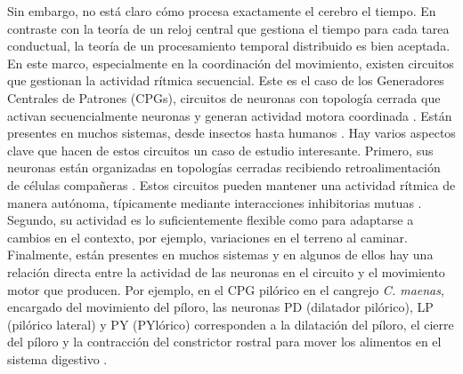 Sin embargo, no está claro cómo procesa exactamente el cerebro el tiempo. En contraste con la teoría de un reloj central que gestiona el tiempo para cada tarea conductual, la teoría de un procesamiento temporal distribuido \parencite{buonomano_temporal_1995,ivry_representation_1996} es bien aceptada. En este marco, especialmente en la coordinación del movimiento, existen circuitos que gestionan la actividad rítmica secuencial. Este es el caso de los Generadores Centrales de Patrones (CPGs), circuitos de neuronas con topología cerrada que activan secuencialmente neuronas y generan actividad motora coordinada \parencite{selverston_reliable_2000}. Están presentes en muchos sistemas, desde insectos hasta humanos \parencite{pearson_central_1972,marder_central_2001,mackay-lyons_central_2002,minassian_human_2017}. Hay varios aspectos clave que hacen de estos circuitos un caso de estudio interesante. Primero, sus neuronas están organizadas en topologías cerradas recibiendo retroalimentación de células compañeras \parencite{huerta_topology_2001}. Estos circuitos pueden mantener una actividad rítmica de manera autónoma, típicamente mediante interacciones inhibitorias mutuas \parencite{katz_evolution_2016}. Segundo, su actividad es lo suficientemente flexible como para adaptarse a cambios en el contexto, por ejemplo, variaciones en el terreno al caminar. Finalmente, están presentes en muchos sistemas y en algunos de ellos hay una relación directa entre la actividad de las neuronas en el circuito y el movimiento motor que producen. Por ejemplo, en el CPG pilórico en el cangrejo \textit{C. maenas}, encargado del movimiento del píloro, las neuronas PD (dilatador pilórico), LP (pilórico lateral) y PY (PYlórico) corresponden a la dilatación del píloro, el cierre del píloro y la contracción del constrictor rostral para mover los alimentos en el sistema digestivo \parencite{moulins_introduction_1987,selverston_oscillations_2006}.

